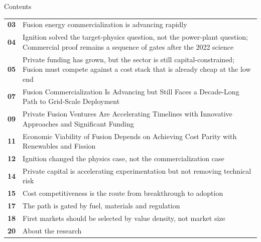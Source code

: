 \documentclass[10pt,a4paper]{article}
\begin{document}
\clearpage
\noindent{}\par\vspace{8pt}
{\sffamily\fontsize{26}{31}\selectfont\color{BONavy} Contents}\par\vspace{10pt}
\begin{minipage}[t]{0.95\linewidth}
\begin{tabularx}{\linewidth}{p{12mm}Y}
\textcolor{BOGreen}{\bfseries 03} & {\footnotesize Fusion energy commercialization is advancing rapidly} \\[4pt]
\textcolor{BOGreen}{\bfseries 04} & {\footnotesize Ignition solved the target-physics question, not the power-plant question; Commercial proof remains a sequence of gates after the 2022 science} \\[4pt]
\textcolor{BOGreen}{\bfseries 05} & {\footnotesize Private funding has grown, but the sector is still capital-constrained; Fusion must compete against a cost stack that is already cheap at the low end} \\[4pt]
\textcolor{BOGreen}{\bfseries 07} & {\footnotesize Fusion Commercialization Is Advancing but Still Faces a Decade-Long Path to Grid-Scale Deployment} \\[4pt]
\textcolor{BOGreen}{\bfseries 09} & {\footnotesize Private Fusion Ventures Are Accelerating Timelines with Innovative Approaches and Significant Funding} \\[4pt]
\textcolor{BOGreen}{\bfseries 11} & {\footnotesize Economic Viability of Fusion Depends on Achieving Cost Parity with Renewables and Fission} \\[4pt]
\textcolor{BOGreen}{\bfseries 12} & {\footnotesize Ignition changed the physics case, not the commercialization case} \\[4pt]
\textcolor{BOGreen}{\bfseries 14} & {\footnotesize Private capital is accelerating experimentation but not removing technical risk} \\[4pt]
\textcolor{BOGreen}{\bfseries 15} & {\footnotesize Cost competitiveness is the route from breakthrough to adoption} \\[4pt]
\textcolor{BOGreen}{\bfseries 17} & {\footnotesize The path is gated by fuel, materials and regulation} \\[4pt]
\textcolor{BOGreen}{\bfseries 18} & {\footnotesize First markets should be selected by value density, not market size} \\[4pt]
\textcolor{BOGreen}{\bfseries 20} & {\footnotesize About the research} \\[4pt]
\end{tabularx}
\end{minipage}
\clearpage
\end{document}
